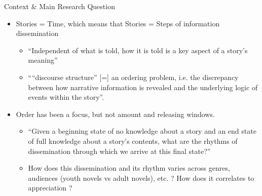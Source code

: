 \documentclass[aspectratio=169]{beamer}
\begin{document}
\begin{frame}{Context \& Main Research Question}
    \begin{itemize}
        \item Stories = Time, which means that Stories = Steps of information dissemination
        \begin{itemize}
            \item ``Independent of what is told, how it is told is a key aspect of a story’s meaning''
            \item ``“discourse structure” [=] an ordering problem, i.e. the discrepancy between how narrative information is revealed and the underlying logic of events within the story''.
        \end{itemize}
        \item Order has been a focus, but not amount and releasing windows.
        \begin{itemize}
            \item ``Given a beginning state of no knowledge about a story and an end state of full knowledge about a story’s contents, what are the rhythms of dissemination through which we arrive at this final state?''
            \item How does this dissemination and its rhythm varies across genres, audiences (youth novels vs adult novels), etc. ? How does it correlates to appreciation  ?  
        \end{itemize}
    \end{itemize}
\end{frame}
\end{document}

